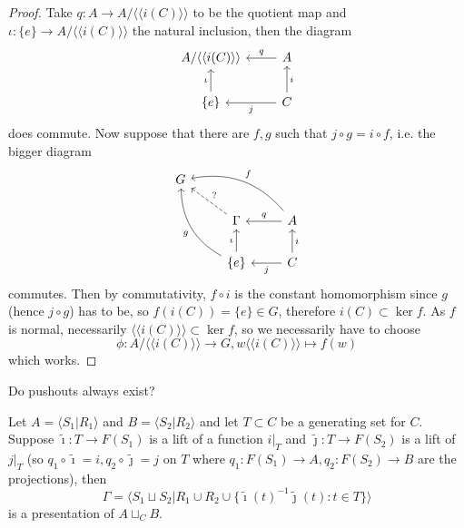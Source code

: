 \begin{proof}
    Take $q:A\to A/\langle\langle i(C)\rangle\rangle$ to be the quotient map and $\iota:\{e\}\to A/\langle\langle i(C)\rangle\rangle$ the natural inclusion, then the diagram
    \[
        \begin{tikzcd}
            A/\langle\langle i(C)\rangle\rangle&A\arrow[swap]{l}{q}\\
            \{e\}\arrow{u}{\iota}&C\arrow{l}{j}\arrow[swap]{u}{i}
        \end{tikzcd}
    \]
    does commute.
    Now suppose that there are $f,g$ such that $j\circ g=i\circ f$, i.e. the bigger diagram
    \[
        \begin{tikzcd}
            G&&\\
            &\Gamma\arrow[swap,dashed]{ul}{?}&A\arrow[swap]{l}{q}\arrow[swap, bend right]{ull}{f}\\
            &\{e\}\arrow{u}{\iota}\arrow[bend left]{uul}{g}&C\arrow{l}{j}\arrow[swap]{u}{i}
        \end{tikzcd}
    \]
    commutes.
    Then by commutativity, $f\circ i$ is the constant homomorphism since $g$ (hence $j\circ g$) has to be, so $f(i(C))=\{e\}\in G$, therefore $i(C)\subset\ker f$.
    As $f$ is normal, necessarily $\langle\langle i(C)\rangle\rangle\subset\ker f$, so we necessarily have to choose
    $$\phi:A/\langle\langle i(C)\rangle\rangle\to G,w\langle\langle i(C)\rangle\rangle\mapsto f(w)$$
    which works.
\end{proof}
Do pushouts always exist?
\begin{lemma}
    Let $A=\langle S_1|R_1\rangle$ and $B=\langle S_2|R_2\rangle$ and let $T\subset C$ be a generating set for $C$.
    Suppose $\tilde\imath:T\to F(S_1)$ is a lift of a function $i|_T$ and $\tilde\jmath:T\to F(S_2)$ is a lift of $j|_T$ (so $q_1\circ\tilde\imath=i,q_2\circ\tilde\jmath=j$ on $T$ where $q_1:F(S_1)\to A,q_2:F(S_2)\to B$ are the projections), then
    $$\Gamma=\langle S_1\sqcup S_2|R_1\cup R_2\cup \{\tilde\imath(t)^{-1}\tilde\jmath(t):t\in T\}\rangle$$
    is a presentation of $A\sqcup_CB$.
\end{lemma}
